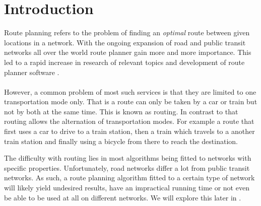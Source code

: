 \chapter{Introduction}\label{introduction}
	Route planning refers to the problem of finding an \textit{optimal} route between given locations in a network.
	With the ongoing expansion of road and public transit networks all over the world route planner gain more and
	more importance. This led to a rapid increase in research 
	of relevant topics and development of route planner software .\\\\
	However, a common problem of most such services is that they are limited to one transportation mode only.
	That is a route can only be taken by a car or train but not by both at the same time. This is known as \uniModal routing.
	In contrast to that \multiModal routing allows the alternation of transportation modes. For example a route that
	first uses a car to drive to a train station, then a train which travels to a another train station and finally
	using a bicycle from there to reach the destination.
	
	The difficulty with \multiModal routing lies in most algorithms being fitted to networks with specific properties.
	Unfortunately, road networks differ a lot from public transit networks. As such, a route planning algorithm
	fitted to a certain type of network will likely yield undesired results, have an impractical running time or not
	even be able to be used at all on different networks. We will explore this later in .

